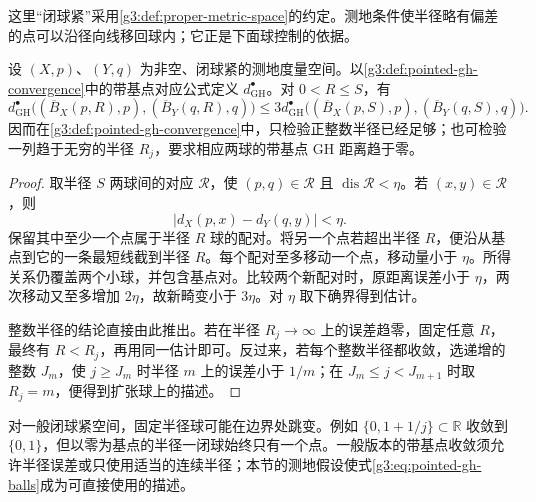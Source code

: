 这里“闭球紧”采用\cref{g3:def:proper-metric-space}的约定。测地条件使半径略有偏差的点可以沿径向线移回球内；它正是下面球控制的依据。

\begin{lemma}\label{g3:lem:pointed-gh-ball-restriction}
	设 \((X,p)\)、\((Y,q)\) 为非空、闭球紧的测地度量空间。以\cref{g3:def:pointed-gh-convergence}中的带基点对应公式定义 \(d_{\mathrm{GH}}^\bullet\)。对 \(0<R\le S\)，有
	\[
		d_{\mathrm{GH}}^\bullet
		\bigl((\overline B_X(p,R),p),(\overline B_Y(q,R),q)\bigr)
		\le3d_{\mathrm{GH}}^\bullet
		\bigl((\overline B_X(p,S),p),(\overline B_Y(q,S),q)\bigr).
	\]
	因而在\cref{g3:def:pointed-gh-convergence}中，只检验正整数半径已经足够；也可检验一列趋于无穷的半径 \(R_j\)，要求相应两球的带基点 GH 距离趋于零。
\end{lemma}
\begin{proof}
	取半径 \(S\) 两球间的对应 \(\mathcal R\)，使 \((p,q)\in\mathcal R\) 且 \(\operatorname{dis}\mathcal R<\eta\)。若 \((x,y)\in\mathcal R\)，则
	\[
		|d_X(p,x)-d_Y(q,y)|<\eta.
	\]
	保留其中至少一个点属于半径 \(R\) 球的配对。将另一个点若超出半径 \(R\)，便沿从基点到它的一条最短线截到半径 \(R\)。每个配对至多移动一个点，移动量小于 \(\eta\)。所得关系仍覆盖两个小球，并包含基点对。比较两个新配对时，原距离误差小于 \(\eta\)，两次移动又至多增加 \(2\eta\)，故新畸变小于 \(3\eta\)。对 \(\eta\) 取下确界得到估计。

	整数半径的结论直接由此推出。若在半径 \(R_j\to\infty\) 上的误差趋零，固定任意 \(R\)，最终有 \(R<R_j\)，再用同一估计即可。反过来，若每个整数半径都收敛，选递增的整数 \(J_m\)，使 \(j\ge J_m\) 时半径 \(m\) 上的误差小于 \(1/m\)；在 \(J_m\le j<J_{m+1}\) 时取 \(R_j=m\)，便得到扩张球上的描述。
\end{proof}

对一般闭球紧空间，固定半径球可能在边界处跳变。例如 \(\{0,1+1/j\}\subset\mathbb R\) 收敛到 \(\{0,1\}\)，但以零为基点的半径一闭球始终只有一个点。一般版本的带基点收敛须允许半径误差或只使用适当的连续半径；本节的测地假设使式\eqref{g3:eq:pointed-gh-balls}成为可直接使用的描述。

